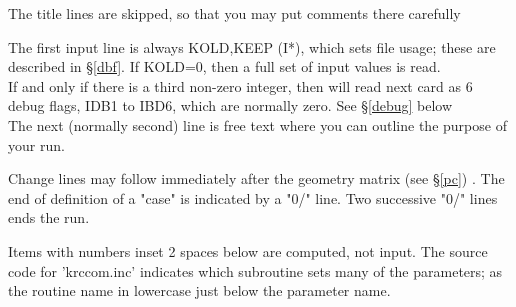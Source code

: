 \documentclass[draft]{article}  %
\newcommand{\qi}{\\ \hspace*{2.em}}      %
\begin{document}
The title lines are skipped, so that you may put comments there carefully

The first input line is always KOLD,KEEP (I*), which sets file usage; these are
described in \S \ref{dbf}. If KOLD=0, then a full set of input values is read.
\qi  If and only if there is a third non-zero integer, then will read next card as
  6 debug flags, IDB1 to IBD6, which are normally zero. 
  See \S \ref{debug} below \\
The next (normally second) line is free text where you can outline the purpose 
of your run.

Change lines may follow immediately after the geometry matrix (see \S \ref{pc})
. The end of definition of a "case" is indicated by a "0/" line. Two successive
"0/" lines ends the run.

Items with numbers inset 2 spaces below are computed, not input.                
The source code for 'krccom.inc' indicates which subroutine sets many of the 
parameters; as the routine name in lowercase just below the parameter name.
\vspace{-3.mm} 
\end{document}
